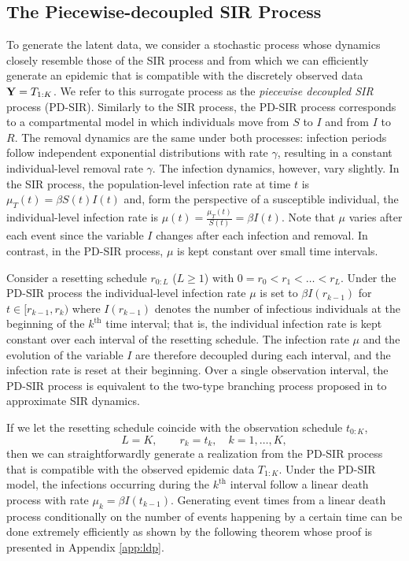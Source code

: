 \documentclass[11pt]{article}
\begin{document}
	\subsection{The Piecewise-decoupled SIR Process}
	\label{sec:pds}
	To generate the latent data, we consider a stochastic process whose dynamics closely resemble those of the SIR process and from which we can efficiently generate an epidemic that is compatible with the discretely observed data $\mathbf{Y} = T_{1:K}$. We refer to this surrogate process as the \textit{piecewise decoupled SIR} process (PD-SIR).
	Similarly to the SIR process, the PD-SIR process corresponds to a compartmental model in which individuals move from $S$ to $I$ and from $I$ to $R$.
	The removal dynamics are the same under both processes: infection periods follow independent exponential distributions with rate $\gamma$, resulting in a constant individual-level removal rate $\gamma$. The infection dynamics, however, vary slightly.
	In the SIR process, the population-level infection rate at time $t$ is $\mu_T(t) = \beta S(t)I(t)$ and, form the perspective of a susceptible individual, the individual-level infection rate is $\mu(t) = \frac{\mu_T(t)}{S(t)} = \beta I(t)$. Note that $\mu$ varies after each event since the variable $I$ changes after each infection and removal.
	In contrast, in the PD-SIR process, $\mu$ is kept constant over small time intervals.
	 	
	Consider a resetting schedule $r_{0:L}$ ($L\ge1$) with $0 = r_0 < r_1 < \dots < r_L$. Under the PD-SIR process the individual-level infection rate $\mu$ is set to $\beta I(r_{k - 1})$ for $t \in [r_{k - 1}, r_k)$ where $I(r_{k-1})$ denotes the number of infectious individuals at the beginning of the $k^{\text{th}}$ time interval; that is, the individual infection rate is kept constant over each interval of the resetting schedule. The infection rate $\mu$ and the evolution of the variable $I$ are therefore decoupled during each interval, and the infection rate is reset at their beginning. Over a single observation interval, the PD-SIR process is equivalent to the two-type branching process proposed in \cite{Ho.2018} to approximate SIR dynamics.
	
	If we let the resetting schedule coincide with the observation schedule $t_{0:K}$,
	$$L = K, \qquad r_k = t_k, \quad k=1,\dots,K,$$
	then we can straightforwardly generate a realization from the PD-SIR process that is compatible with the observed epidemic data $T_{1:K}$. Under the PD-SIR model, the infections occurring during the $k^{\text{th}}$ interval follow a linear death process with rate $\mu_k = \beta I(t_{k-1})$. Generating event times from a linear death process conditionally on the number of events happening by a certain time can be done extremely efficiently as shown by the following theorem whose proof is presented in Appendix \ref{app:ldp}.
	
\end{document}
